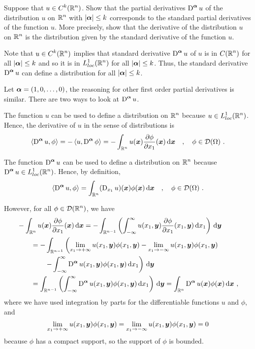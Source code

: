 \begin{egg}
Suppose that $\displaystyle u \in C^k(\mathbb{R}^n)$.  Show that the partial
derivatives $\displaystyle \operatorname{D}^{{\bm{\alpha}}} u$ of the distribution $u$ on
$\displaystyle \mathbb{R}^n$ with $|{\bm{\alpha}}|\leq k$
corresponds to the standard partial derivatives of the function $u$.  More
precisely, show that the derivative of the distribution $u$ on
$\displaystyle \mathbb{R}^n$ is the distribution given by the standard
derivative of the function $u$.

Note that $\displaystyle u \in C^k(\mathbb{R}^n)$ implies that standard derivative
$\displaystyle \operatorname{D}^{{\bm{\alpha}}} u$ of $u$ is in $\displaystyle C(\mathbb{R}^n)$
for all $|{\bm{\alpha}}|\leq k$ and
so it is in $\displaystyle L_{loc}^1(\mathbb{R}^n)$ for all $|{\bm{\alpha}}|\leq k$.
Thus, the standard derivative $\displaystyle \operatorname{D}^{{\bm{\alpha}}} u$
can define a distribution for all $|{\bm{\alpha}}|\leq k$.

Let ${\bm{\alpha}} = (1,0,\ldots,0)$, the reasoning for other first order
partial derivatives is similar. There are two ways to look at
$\displaystyle \operatorname{D}^{{\bm{\alpha}}} u$.

 The function $u$ can be used to define a
distribution on $\displaystyle \mathbb{R}^n$ because
$\displaystyle u\in L_{loc}^1(\mathbb{R}^n)$.  Hence, the 
derivative of $u$ in the sense of distributions is
\[
\left\langle{\operatorname{D}^{{\bm{\alpha}}} u} , {\phi}\right\rangle = -\left\langle{u} , {\operatorname{D}^{{\bm{\alpha}}} \phi}\right\rangle =
-\int_{\mathbb{R}^n} u({\bm{x}}) \frac{\partial{\phi}}{\partial x_1}({\bm{x}}) \,\mathrm{d}{{\bm{x}}}
\quad , \quad \phi \in \mathcal{D}(\Omega) \ .
\]

 The function $\displaystyle \operatorname{D}^{{\bm{\alpha}}} u$ can be
used to define a distribution on $\displaystyle \mathbb{R}^n$ because
$\displaystyle \operatorname{D}^{{\bm{\alpha}}} u\in L_{loc}^1(\mathbb{R}^n)$.
Hence, by definition,
\[
\left\langle{\operatorname{D}^{{\bm{\alpha}}} u} , {\phi}\right\rangle =
\int_{\mathbb{R}^n} (\operatorname{D}_{x_1}u)({\bm{x}}) \phi({\bm{x}}) \,\mathrm{d}{{\bm{x}}}
\quad , \quad \phi \in \mathcal{D}(\Omega) \ .
\]

However, for all $\displaystyle \phi \in \mathcal{D}(\mathbb{R}^n)$, we have
\begin{align*}
&-\int_{\mathbb{R}^n} u({\bm{x}}) \frac{\partial{\phi}}{\partial x_1}({\bm{x}}) \,\mathrm{d}{{\bm{x}}}
= -\int_{\mathbb{R}^{n-1}} \left( \int_{-\infty}^\infty u(x_1,{\bm{y}})
\frac{\partial{\phi}}{\partial x_1}(x_1,{\bm{y}})\,\mathrm{d}{x_1}\right) \,\mathrm{d}{{\bm{y}}} \\
&\qquad = -\int_{\mathbb{R}^{n-1}} \left(
\lim_{x_1\rightarrow +\infty}u(x_1,{\bm{y}})\phi(x_1,{\bm{y}})
- \lim_{x_1\rightarrow -\infty}u(x_1,{\bm{y}})\phi(x_1,{\bm{y}}) \right. \\
&\qquad \qquad \left. - \int_{-\infty}^\infty
\operatorname{D}^{{\bm{\alpha}}} u(x_1,{\bm{y}})\phi(x_1,{\bm{y}})\,\mathrm{d}{x_1} \right)
\,\mathrm{d}{{\bm{y}}}\\
&\qquad = \int_{\mathbb{R}^{n-1}} \left(\int_{-\infty}^\infty
\operatorname{D}^{{\bm{\alpha}}} u(x_1,{\bm{y}})\phi(x_1,{\bm{y}})\,\mathrm{d}{x_1} \right)
\,\mathrm{d}{{\bm{y}}}
= \int_{\mathbb{R}^n} \operatorname{D}^{{\bm{\alpha}}} u({\bm{x}})\phi({\bm{x}}) \,\mathrm{d}{{\bm{x}}} \ ,
\end{align*}
where we have used integration by parts for the differentiable functions
$u$ and $\phi$, and
\[
\lim_{x_1\rightarrow +\infty}u(x_1,{\bm{y}})\phi(x_1,{\bm{y}})
= \lim_{x_1\rightarrow -\infty}u(x_1,{\bm{y}})\phi(x_1,{\bm{y}}) = 0
\]
because $\phi$ has a compact support, so the support of $\phi$ is bounded.


\end{egg}
